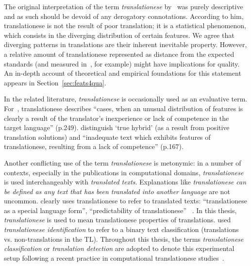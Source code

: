 The original interpretation of the term \textit{translationese} by~\citet{Gellerstam1986} was purely descriptive and as such should be devoid of any derogatory connotations. According to him, translationese is not the result of poor translation; it is a statistical phenomenon, which consists in the diverging distribution of certain features.
We agree that diverging patterns in translations are their inherent inevitable property. However, a relative amount of translationese represented as distance from the expected standards (and measured in~\citet{Sutter2017}, for example) might have implications for quality. An in-depth account of theoretical and empirical foundations for this statement appears in Section~\ref{sec:feats4qua}. 

In the related literature, \textit{translationese} is occasionally used as an \hypertarget{wd:evaluative}{evaluative} term. For~\citet{Baker1993}, translationese describes ``cases, when an unusual distribution of features is clearly a result of the translator's inexperience or lack of competence in the target language'' (p.249). \citet{BlumKulka1986} distinguish `true hybrid' (as a result from positive translation solutions) and ``inadequate text which exhibits features of translationese, resulting from a lack of competence'' (p.167). 

Another conflicting use of the term \textit{translationese} is metonymic: in a number of contexts, especially in the publications in computational domains, \textit{translationese} is used interchangeably with \textit{translated texts}. Explanations like \textit{translationese can be defined as any text that has been translated into another language} are not uncommon. \citet{Nikolaev2020} clearly uses translationese to refer to translated texts: ``translationese as a special language form'', ``predictability of translationese'' ~\cite[see also  ``$\dots$ contains elements of both original text and translationese'' in ][p.52]{Carter2012}. 
In this thesis, \textit{translationese} is used to mean translationese properties of translations.
\citet{Popescu2011} used \textit{translationese identification} to refer to a binary text classification (translations vs. non-translations in the TL). Throughout this thesis, the terms \textit{translationese classification} or \textit{translation detection} are adopted to denote this experimental setup following a recent practice in computational translationese studies~\cite[see, for example,][]{Pylypenko2021}. 

